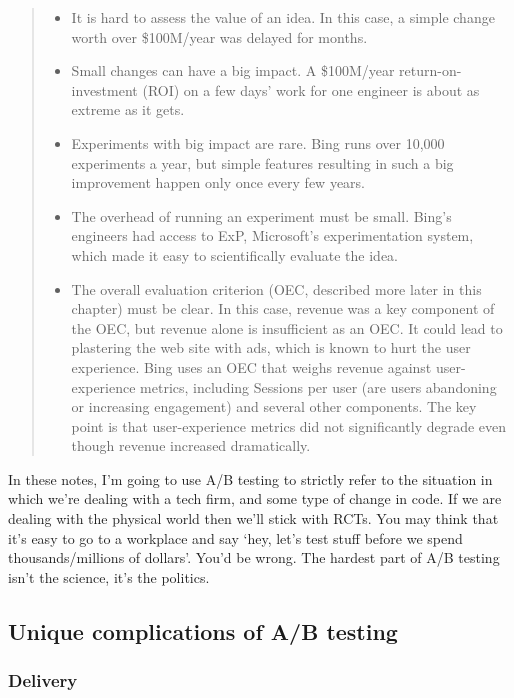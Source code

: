 \documentclass[
]{book}
\providecommand{\tightlist}{%
  \setlength{\itemsep}{0pt}\setlength{\parskip}{0pt}}
\begin{document}
\begin{quote}
\begin{itemize}
\tightlist
\item
  It is hard to assess the value of an idea. In this case, a simple change worth over \$100M/year was delayed for months.
\item
  Small changes can have a big impact. A \$100M/year return-on-investment (ROI) on a few days' work for one engineer is about as extreme as it gets.
\item
  Experiments with big impact are rare. Bing runs over 10,000 experiments a year, but simple features resulting in such a big improvement happen only once every few years.
\item
  The overhead of running an experiment must be small. Bing's engineers had access to ExP, Microsoft's experimentation system, which made it easy to scientifically evaluate the idea.
\item
  The overall evaluation criterion (OEC, described more later in this chapter) must be clear. In this case, revenue was a key component of the OEC, but revenue alone is insufficient as an OEC. It could lead to plastering the web site with ads, which is known to hurt the user experience. Bing uses an OEC that weighs revenue against user-experience metrics, including Sessions per user (are users abandoning or increasing engagement) and several other components. The key point is that user-experience metrics did not significantly degrade even though revenue increased dramatically.
\end{itemize}
\end{quote}

In these notes, I'm going to use A/B testing to strictly refer to the situation in which we're dealing with a tech firm, and some type of change in code. If we are dealing with the physical world then we'll stick with RCTs. You may think that it's easy to go to a workplace and say `hey, let's test stuff before we spend thousands/millions of dollars'. You'd be wrong. The hardest part of A/B testing isn't the science, it's the politics.

\hypertarget{unique-complications-of-ab-testing}{%
\subsection{Unique complications of A/B testing}\label{unique-complications-of-ab-testing}}

\hypertarget{delivery}{%
\subsubsection{Delivery}\label{delivery}}
\end{document}
